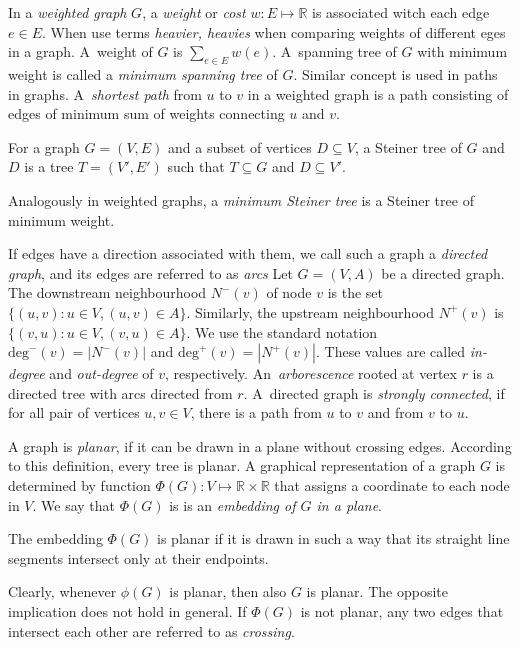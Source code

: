 In a \emph{weighted graph} $G$, a \emph{weight} or \emph{cost} $w:E\mapsto\mathbb{R}$ is associated witch each edge $e\in E$.
When use terms \emph{heavier, heavies} when comparing weights of different eges in a graph.
A~weight of $G$ is $\sum_{e\in E}w(e)$.
A~spanning tree of $G$ with minimum weight is called a \emph{minimum spanning tree} of $G$.
Similar concept is used in paths in graphs.
A~\emph{shortest path} from $u$ to $v$ in a weighted graph is a path consisting of edges of minimum sum of weights connecting $u$ and $v$.
\begin{definition}
	For a graph $G=(V,E)$ and a subset of vertices $D\subseteq V$, a Steiner tree of $G$ and $D$ is a tree $T=(V',E')$ such that $T\subseteq G$ and $D\subseteq V'$.
\end{definition}
Analogously in weighted graphs, a \emph{minimum Steiner tree} is a Steiner tree of minimum weight.

If edges have a direction associated with them, we call such a graph a \emph{directed graph}, and its edges are referred to as \emph{arcs}
Let $G=(V,A)$ be a directed graph. 
The downstream neighbourhood $N^-(v)$ of node $v$ is the set $\{(u,v): u\in V, (u,v) \in A\}$. 
Similarly, the upstream neighbourhood $N^+(v)$ is $\{(v,u): u\in V, (v,u) \in A\}$.
We use the standard notation $\text{deg}^-(v)=|N^-(v)|$ and $\text{deg}^+(v)=|N^+(v)|$.
These values are called \emph{in-degree} and \emph{out-degree} of $v$, respectively.
An~\emph{arborescence} rooted at vertex $r$ is a directed tree with arcs directed from $r$.
A~directed graph is \emph{strongly connected}, if for all pair of vertices $u,v\in V$, there is a path from $u$ to $v$ and from $v$ to $u$.

A graph is \emph{planar}, if it can be drawn in a plane without crossing edges.
According to this definition, every tree is planar. 
A graphical representation of a graph $G$ is determined by function $\Phi(G):V\mapsto\mathbb{R}\times\mathbb{R}$ that assigns a coordinate to each node in $V$. 
We say that $\Phi(G)$ is is an \emph{embedding of $G$ in a plane}.
\begin{definition}\label{def:planemb}
The embedding $\Phi(G)$ is planar if it is drawn in such a way that its straight line segments intersect only at their endpoints.
\end{definition}
Clearly, whenever $\phi(G)$ is planar, then also $G$ is planar. 
The opposite implication does not hold in general. 
If $\Phi(G)$ is not planar, any two edges that intersect each other are referred to as \emph{crossing}.

